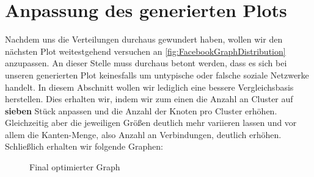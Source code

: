 \section{Anpassung des generierten Plots}
Nachdem uns die Verteilungen durchaus gewundert haben, wollen wir den nächsten Plot weitestgehend versuchen an \ref{fig:FacebookGraphDistribution} anzupassen. An dieser Stelle muss durchaus betont werden, dass es sich bei unseren generierten Plot keinesfalls um untypische oder falsche soziale Netzwerke handelt. In diesem Abschnitt wollen wir lediglich eine bessere Vergleichsbasis herstellen. Dies erhalten wir, indem wir zum einen die Anzahl an Cluster auf \textbf{sieben} Stück anpassen und die Anzahl der Knoten pro Cluster erhöhen. Gleichzeitig aber die jeweiligen Größen deutlich mehr variieren lassen und vor allem die Kanten-Menge, also Anzahl an Verbindungen, deutlich erhöhen. Schließlich erhalten wir folgende Graphen: 

\FloatBarrier
\begin{figure}[h!]%
  \centering
  \qquad
  \caption{Final optimierter Graph}
  \label{fig:ourGraphFinalPlot}
\end{figure}
\FloatBarrier

